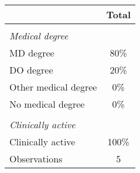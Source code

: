 \begin{tabular}{lc}
\toprule
\addlinespace
 & Total\\
\hline
\vspace{0.01em} \\ \emph{Medical degree} \\
\hspace{0.25cm} MD degree & 80\% \\
\hspace{0.25cm} DO degree & 20\% \\
\hspace{0.25cm} Other medical degree & 0\% \\
\hspace{0.25cm} No medical degree & 0\% \\
\vspace{0.01em} \\ \emph{Clinically active} \\
\hspace{0.25cm} Clinically active & 100\% \\
\hline
Observations & 5 \\
\bottomrule
\end{tabular}

